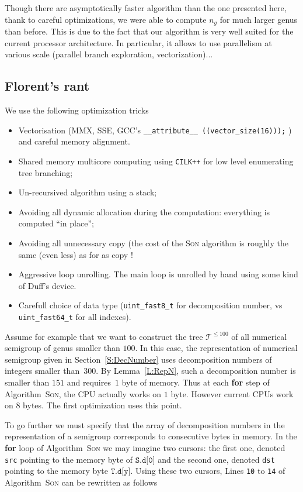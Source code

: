 \documentclass[reqno,11pt]{amsart}
\theoremstyle{plain}
\theoremstyle{definition}
\renewcommand{\leq}{\leqslant}
\renewcommand{\tt}[1]{\texttt{#1}}
\begin{document}
Though there are asymptotically faster algorithm than the one presented here,
thank to careful optimizations, we were able to compute $n_g$ for much larger
genus than before. This is due to the fact that our algorithm is very well
suited for the current processor architecture. In particular, it allows to use
parallelism at various scale (parallel branch exploration, vectorization)...


\subsection{Florent's rant}

We use the following optimization tricks
\begin{itemize}
\item Vectorisation (MMX, SSE, GCC's 
\verb|__attribute__ ((vector_size(16)));|
) and careful memory alignment.
\item Shared memory multicore computing using \texttt{CILK++} for low level
  enumerating tree branching;
\item Un-recursived algorithm using a stack;
\item Avoiding all dynamic allocation during the computation: everything is
  computed ``in place'';
\item Avoiding all unnecessary copy (the cost of the \textsc{Son} algorithm is
  roughly the same (even less) as for as copy !
\item Aggressive loop unrolling. The main loop is unrolled by hand using some
  kind of Duff's device.
\item Carefull choice of data type (\verb|uint_fast8_t| for decomposition
  number, vs \verb|uint_fast64_t| for all indexes).
\end{itemize}

\label{S:Opti}

Assume for example that we want to construct the tree $\mathcal{T}^{\leq 100}$ of all  numerical semigroup of  genus smaller than $100$. 
In this case, the representation of  numerical  semigroup given in Section~\ref{S:DecNumber} uses decomposition numbers of integers smaller than~$300$.
By Lemma~\ref{L:RepN}, such a decomposition number is smaller than $151$ and requires~$1$ byte of memory.
Thus at each \textbf{for} step of Algorithm~\textsc{Son}, the CPU actually works on $1$ byte. 
However current CPUs work on $8$ bytes.
The first optimization uses this point.

To go further we must specify that the array of decomposition numbers in the representation of a semigroup corresponds to consecutive bytes in memory. 
In the \textbf{for} loop of Algorithm~\textsc{Son} we may imagine two cursors: the first one, denoted \texttt{src}  pointing to the memory byte of $\texttt{S.d[0]}$  and the second one, denoted \texttt{dst} pointing to the memory byte $\texttt{T.d[y]}$.
Using these two cursors, Lines \tt{10} to \tt{14} of Algorithm~\textsc{Son} can be rewritten as follows
\end{document}
